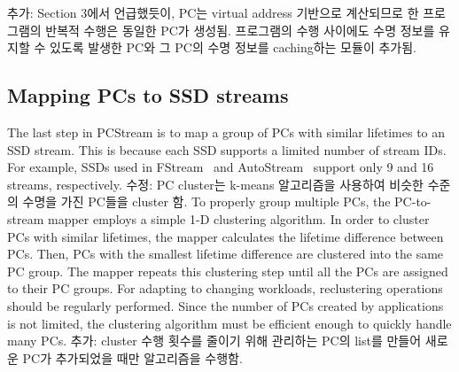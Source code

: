 {\color{blue} 추가: Section 3에서 언급했듯이, PC는 virtual address 기반으로 계산되므로
한 프로그램의 반복적 수행은 동일한 PC가 생성됨.
프로그램의 수행 사이에도 수명 정보를 유지할 수 있도록
발생한 PC와 그 PC의 수명 정보를 caching하는 모듈이 추가됨.}

\subsection{Mapping PCs to SSD streams}

The last step in \textsf{\small PCStream} is to map
a group of PCs with similar lifetimes to an SSD stream.
This is because each SSD supports a limited number of stream IDs. For
example, SSDs used in \textsf{\small FStream}~\cite{FStream} and \textsf{\small AutoStream}~\cite{AutoStream}
support only 9 and 16 streams, respectively. 
{\color{blue} 수정: PC cluster는 k-means 알고리즘을 사용하여 비슷한 수준의 수명을 가진 PC들을 cluster 함.}
To properly group multiple PCs,
the PC-to-stream mapper employs a simple 1-D clustering algorithm. 
In order to cluster PCs with similar lifetimes, the mapper calculates the 
lifetime difference between PCs.
Then, PCs with the smallest lifetime difference are clustered into the same PC group. 
The mapper repeats this clustering step until all the PCs are assigned to their PC groups.
For adapting to changing
workloads, reclustering operations should be regularly performed. Since the
number of PCs created by applications is not limited, the clustering algorithm
must be efficient enough to quickly handle many PCs. 
{\color{blue} 추가: cluster 수행 횟수를 줄이기 위해 관리하는 PC의 list를 만들어 
새로운 PC가 추가되었을 때만 알고리즘을 수행함.}


